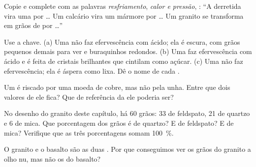 \begin{exercise}[$\star$]\label{exo:g6:rocks-and-minerals:4}
Copie e complete com as palavras \emph{resfriamento}, \emph{calor e
pressão}, \emph{}: ``A  derretida vira uma  por
\ldots{} Um calcário vira um mármore por \ldots{} Um granito se transforma
em grãos de  por \ldots''
\end{exercise}

\begin{exercise}[$\star\star$]\label{exo:g6:rocks-and-minerals:5}
Use a chave. (a) Uma  não faz efervescência com ácido; ela é escura,
com grãos pequenos demais para ver e buraquinhos redondos. (b) Uma 
faz efervescência com ácido e é feita de cristais brilhantes que cintilam
como açúcar. (c) Uma  não faz efervescência; ela é áspera como lixa.
Dê o nome de cada .
\end{exercise}

\begin{exercise}[$\star\star$]\label{exo:g6:rocks-and-minerals:6}
Um  é riscado por uma moeda de cobre, mas não pela unha. Entre que
dois valores de  ele fica? Que  de referência da  ele poderia ser?
\end{exercise}

\begin{exercise}[$\star\star$]\label{exo:g6:rocks-and-minerals:7}
No desenho do granito deste capítulo, há 60 grãos: 33 de feldspato, 21 de
quartzo e 6 de mica. Que porcentagem dos grãos é de quartzo? E de
feldspato? E de mica? Verifique que as três porcentagens somam
100~\%.
\end{exercise}

\begin{exercise}[$\star\star$]\label{exo:g6:rocks-and-minerals:8}
O granito e o basalto são as duas . Por que conseguimos ver
os grãos do granito a olho nu, mas não os do basalto?
\end{exercise}

